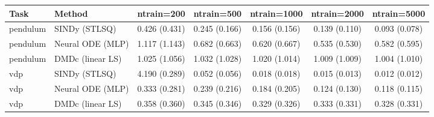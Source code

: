\begin{tabular}{llccccc}\toprule
Task & Method & ntrain=200 & ntrain=500 & ntrain=1000 & ntrain=2000 & ntrain=5000 \\\midrule
pendulum & SINDy (STLSQ) & 0.426 (0.431) & 0.245 (0.166) & 0.156 (0.156) & 0.139 (0.110) & 0.093 (0.078) \\
pendulum & Neural ODE (MLP) & 1.117 (1.143) & 0.682 (0.663) & 0.620 (0.667) & 0.535 (0.530) & 0.582 (0.595) \\
pendulum & DMDc (linear LS) & 1.025 (1.056) & 1.032 (1.028) & 1.020 (1.014) & 1.009 (1.009) & 1.004 (1.010) \\
vdp & SINDy (STLSQ) & 4.190 (0.289) & 0.052 (0.056) & 0.018 (0.018) & 0.015 (0.013) & 0.012 (0.012) \\
vdp & Neural ODE (MLP) & 0.333 (0.281) & 0.239 (0.216) & 0.184 (0.205) & 0.124 (0.130) & 0.118 (0.115) \\
vdp & DMDc (linear LS) & 0.358 (0.360) & 0.345 (0.346) & 0.329 (0.326) & 0.333 (0.331) & 0.328 (0.331) \\
\bottomrule\end{tabular}
